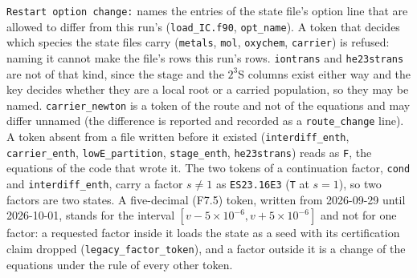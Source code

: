 \texttt{Restart option change:} names the entries of the state file's option
line that are allowed to differ from this run's (\texttt{load\_IC.f90},
\texttt{opt\_name}).  A token that decides which species the state files
carry (\texttt{metals}, \texttt{mol}, \texttt{oxychem}, \texttt{carrier}) is
refused: naming it cannot make the file's rows this run's rows.
\texttt{iontrans} and \texttt{he23strans} are not of that kind, since the
stage and the $2^3$S columns exist either way and the key decides whether
they are a local root or a carried population, so they may be named.
\texttt{carrier\_newton} is a token of the route and not of the equations and
may differ unnamed (the difference is reported and recorded as a
\texttt{route\_change} line).  A token absent from a file written before it
existed (\texttt{interdiff\_enth}, \texttt{carrier\_enth},
\texttt{lowE\_partition}, \texttt{stage\_enth}, \texttt{he23strans}) reads as
\texttt{F}, the equations of the code that wrote it.  The two tokens of a
continuation factor, \texttt{cond} and \texttt{interdiff\_enth}, carry a
factor $s\ne1$ as \texttt{ES23.16E3} (\texttt{T} at $s = 1$), so two factors
are two states.  A five-decimal (F7.5) token, written from 2026-09-29 until
2026-10-01, stands for the interval $[v-5\times10^{-6}, v+5\times10^{-6}]$
and not for one factor: a requested factor inside it loads the state as a
seed with its certification claim dropped (\texttt{legacy\_factor\_token}),
and a factor outside it is a change of the equations under the rule of every
other token.

